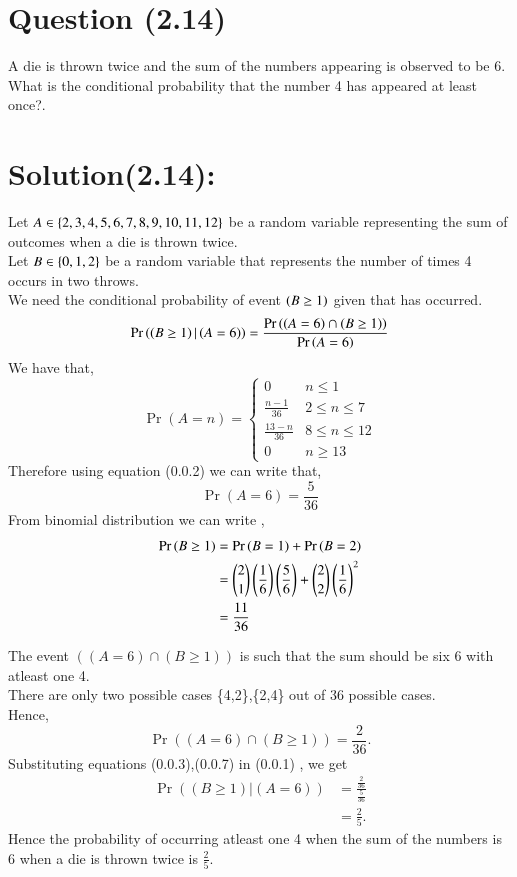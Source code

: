 \documentclass[journal,12pt,twocolumn]{IEEEtran}
\begin{document}
\section*{Question (2.14)}
A die is thrown twice and the sum of the numbers appearing is observed to be 6. What is the conditional probability that the number 4 has appeared at least once?.
\section*{Solution(2.14):}
Let $A \in \left\{2,3,4,5,6,7,8,9,10,11,12\right\}$ be a random variable representing the sum of outcomes when a die is thrown twice.\\
Let $B \in \left\{0,1,2\right\}$  be a random variable that represents the number of times 4 occurs in two throws.\\
We need the conditional probability of event $\left(B \geq 1\right)$ given that  has occurred.\\ 
\begin{equation}
    \Pr{\ensuremath{\left(\left(B \geq 1\right)|\left(A=6\right)\right)}}
    =\frac{\Pr{((A=6)\cap(B \geq 1))}}{\Pr{\ensuremath{\left(A=6\right)}}}
\end{equation}
We have that,\\
\begin{equation}
\Pr{(A=n)}=
\begin{cases}
    0 & n \leq 1\\
    \frac{n-1}{36} & 2\leq n \leq 7\\
    \frac{13-n}{36} & 8 \leq n \leq 12\\
    0 & n \geq 13
\end{cases}
\end{equation}
Therefore using equation (0.0.2) we can write that,
\begin{equation}
    \Pr{(A=6)}=\frac{5}{36}
\end{equation}
From binomial distribution we can write ,
\begin{align}
    \Pr{(B \geq 1)}&=\Pr{(B =1)}+\Pr{(B=2)} \\ &= \binom{2}{1} \left(\frac{1}{6}\right)\left(\frac{5}{6}\right)+\binom{2}{2} \left(\frac{1}{6}\right)^2\\
    &=\frac{11}{36}
\end{align}

The event $((A=6) \cap (B\geq 1))$ is such that the sum should be six 6 with atleast one 4.\\
There are only two possible cases \{4,2\},\{2,4\} out of 36 possible cases.\\
Hence,\\
\begin{equation}
    \Pr{((A=6) \cap (B\geq 1))}=\frac{2}{36}.    
\end{equation}
Substituting equations (0.0.3),(0.0.7) in (0.0.1) , we get\\
\begin{equation}
\begin{split}
\Pr((B \geq 1)|(A=6
))&=\frac{\frac{2}{36}}{\frac{5}{36}}\\
&=\frac{2}{5}.
\end{split}
\end{equation}
Hence the probability of occurring atleast one 4 when the sum of the numbers is 6 when a die is thrown twice is $\frac{2}{5}$. 
\end{document}
